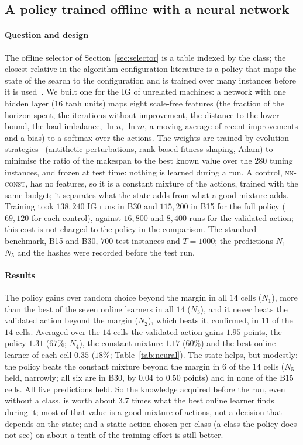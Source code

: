 

\subsection{A policy trained offline with a neural network}
\label{sec:neural}
\paragraph{Question and design} The offline selector of Section~\ref{sec:selector} is a table indexed by the class; the closest relative in the algorithm-configuration literature is a policy that maps the state of the search to the configuration and is trained over many instances before it is used~\cite{BiedenkappEtal2020,EimerEtal2021}. We built one for the IG of unrelated machines: a network with one hidden layer ($16$ tanh units) maps eight scale-free features (the fraction of the horizon spent, the iterations without improvement, the distance to the lower bound, the load imbalance, $\ln n$, $\ln m$, a moving average of recent improvements and a bias) to a softmax over the actions. The weights are trained by evolution strategies~\cite{SalimansEtal2017} (antithetic perturbations, rank-based fitness shaping, Adam) to minimise the ratio of the makespan to the best known value over the $280$ tuning instances, and frozen at test time: nothing is learned during a run. A control, \textsc{nn-const}, has no features, so it is a constant mixture of the actions, trained with the same budget; it separates what the state adds from what a good mixture adds. Training took $138{,}240$ IG runs in B30 and $115{,}200$ in B15 for the full policy ($69{,}120$ for each control), against $16{,}800$ and $8{,}400$ runs for the validated action; this cost is not charged to the policy in the comparison. The standard benchmark, B15 and B30, $700$ test instances and $T=1000$; the predictions $N_1$--$N_5$ and the hashes were recorded before the test run.

\paragraph{Results} The policy gains over random choice beyond the margin in all $14$ cells ($N_1$), more than the best of the seven online learners in all $14$ ($N_3$), and it never beats the validated action beyond the margin ($N_2$), which beats it, confirmed, in $11$ of the $14$ cells. Averaged over the $14$ cells the validated action gains $1.95$ points, the policy $1.31$ ($67\%$; $N_4$), the constant mixture $1.17$ ($60\%$) and the best online learner of each cell $0.35$ ($18\%$; Table~\ref{tab:neural}). The state helps, but modestly: the policy beats the constant mixture beyond the margin in $6$ of the $14$ cells ($N_5$ held, narrowly; all six are in B30, by $0.04$ to $0.50$ points) and in none of the B15 cells. All five predictions held. So the knowledge acquired before the run, even without a class, is worth about $3.7$ times what the best online learner finds during it; most of that value is a good mixture of actions, not a decision that depends on the state; and a static action chosen per class (a class the policy does not see) on about a tenth of the training effort is still better.


